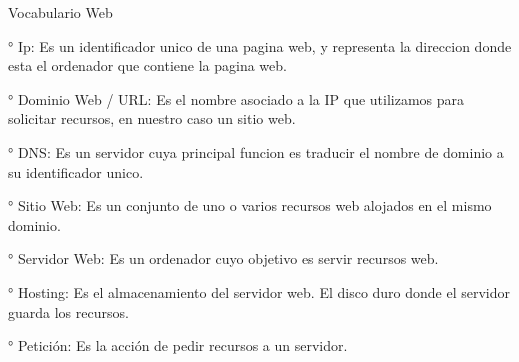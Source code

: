 Vocabulario Web

° Ip: Es un identificador unico de una pagina web, y representa la direccion donde esta el ordenador que contiene la pagina web.


° Dominio Web / URL: Es el nombre asociado a la IP que utilizamos para solicitar recursos, en nuestro caso un sitio web.


° DNS: Es un servidor cuya principal funcion es traducir el nombre de dominio a su identificador unico.


° Sitio Web: Es un conjunto de uno o varios recursos web alojados en el mismo dominio.


° Servidor Web: Es un ordenador cuyo objetivo es servir recursos web.


° Hosting: Es el almacenamiento del servidor web. El disco duro donde el servidor guarda los recursos.


° Petición: Es la acción de pedir recursos a un servidor. 


